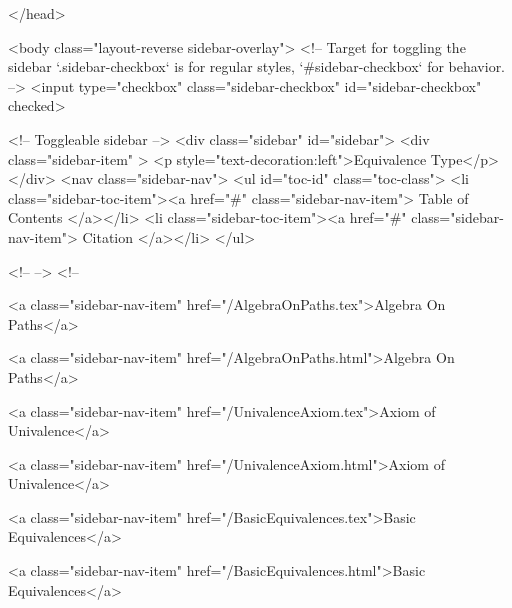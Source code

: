   
</head>




  <body class="layout-reverse sidebar-overlay">
    <!-- Target for toggling the sidebar `.sidebar-checkbox` is for regular
     styles, `#sidebar-checkbox` for behavior. -->
<input type="checkbox" class="sidebar-checkbox" id="sidebar-checkbox" checked>

<!-- Toggleable sidebar -->
<div class="sidebar" id="sidebar">
  <div class="sidebar-item" >
    <p style="text-decoration:left">Equivalence Type</p>
  </div>
  <nav class="sidebar-nav">
    <ul id="toc-id" class="toc-class">
  <li class="sidebar-toc-item"><a href="#" class="sidebar-nav-item"> Table of Contents </a></li>
  <li class="sidebar-toc-item"><a href="#" class="sidebar-nav-item"> Citation </a></li>
</ul>


    <!--  -->
    <!-- 
      
    
      
    
      
    
      
    
      
        
      
    
      
        
          <a class="sidebar-nav-item" href="/AlgebraOnPaths.tex">Algebra On Paths</a>
        
      
    
      
        
          <a class="sidebar-nav-item" href="/AlgebraOnPaths.html">Algebra On Paths</a>
        
      
    
      
        
          <a class="sidebar-nav-item" href="/UnivalenceAxiom.tex">Axiom of Univalence</a>
        
      
    
      
        
          <a class="sidebar-nav-item" href="/UnivalenceAxiom.html">Axiom of Univalence</a>
        
      
    
      
        
          <a class="sidebar-nav-item" href="/BasicEquivalences.tex">Basic Equivalences</a>
        
      
    
      
        
          <a class="sidebar-nav-item" href="/BasicEquivalences.html">Basic Equivalences</a>
        
